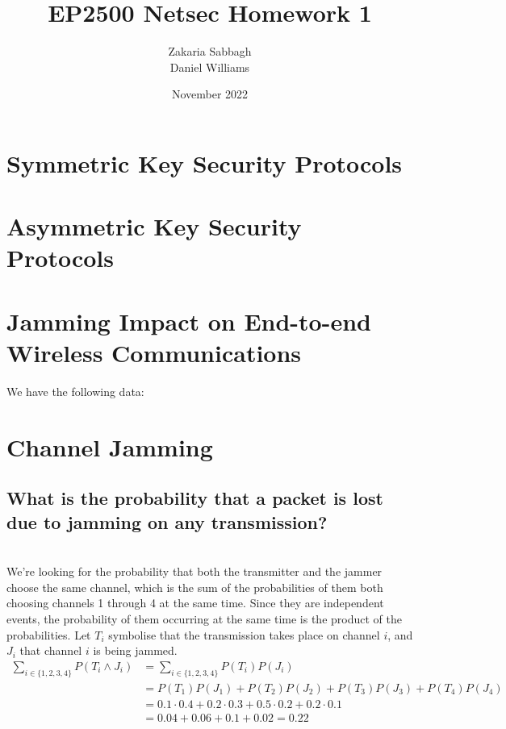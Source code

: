 \documentclass{article}
\title{EP2500 Netsec Homework 1}
\author{Zakaria Sabbagh \\ Daniel Williams}
\date{November 2022}
\begin{document}
\maketitle

\section{Symmetric Key Security Protocols}

\section{Asymmetric Key Security Protocols}

\section{Jamming Impact on End-to-end Wireless Communications}
We have the following data:

\section{Channel Jamming}
\subsection*{What is the probability that a packet is lost due to jamming on any transmission?} \\
We're looking for the probability that both the transmitter and the jammer choose the same channel, which is the sum of the probabilities of them both choosing channels 1 through 4 at the same time. 
Since they are independent events, the probability of them occurring at the same time is the product of the probabilities.
Let $T_i$ symbolise that the transmission takes place on channel $i$, and $J_i$ that channel $i$ is being jammed.
\begin{align*}
    \sum _ {i \in \{1,2,3,4\}}P(T_i \land  J_i)  &= \sum _ {i \in \{1,2,3,4\}}P(T_i)P( J_i) \\
    &= P(T_1)P(J_1)+P(T_2)P(J_2)+P(T_3)P(J_3)+P(T_4)P(J_4) \\
    &= 0.1\cdot 0.4 + 0.2\cdot 0.3 + 0.5 \cdot 0.2 + 0.2\cdot 0.1 \\
    &= 0.04+0.06+0.1+0.02 = 0.22
\end{align*}
\end{document}
